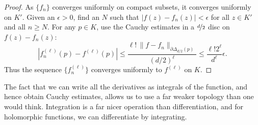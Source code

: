 \documentclass[12pt,openany]{book}
\newcommand{\sabs}[1]{\lvert {#1} \rvert}
\newcommand{\snorm}[1]{\lVert {#1} \rVert}
\newcommand{\abs}[1]{\left\lvert {#1} \right\rvert}
\theoremstyle{plain}
\theoremstyle{remark}
\theoremstyle{definition}
\theoremstyle{exercise}
\theoremstyle{example}
\begin{document}
\begin{proof}
As $\{ f_n \}$ converges uniformly on compact subsets, it converges uniformly
on $K'$.  Given an $\epsilon > 0$, find an $N$ such that 
$\sabs{f(z)-f_n(z)} < \epsilon$ for all $z \in K'$ and
all $n \geq N$.
For any $p \in K$, use the Cauchy estimates in a $\nicefrac{d}{2}$ disc
on $f(z)-f_n(z)$:
\begin{equation*}
\abs{
f_n^{(\ell)}(p)
-
f^{(\ell)}(p)
}
\leq
\frac{\ell! \, \snorm{f-f_n}_{\partial \Delta_{d/2}(p)}}{{(d/2)}^{\ell}}
\leq
\frac{\ell!2^\ell}{d^\ell}\epsilon .
\end{equation*}
Thus the sequence $\bigl\{ f_n^{(\ell)} \bigr\}$ converges uniformly to $f^{(\ell)}$ on $K$.
\end{proof}

The fact that we can write all the derivatives as
integrals of the function, and hence obtain Cauchy estimates,
allows us to use a far weaker topology than one would think.
Integration is a far nicer operation than differentiation, and for
holomorphic functions, we can differentiate by integrating.
\end{document}
